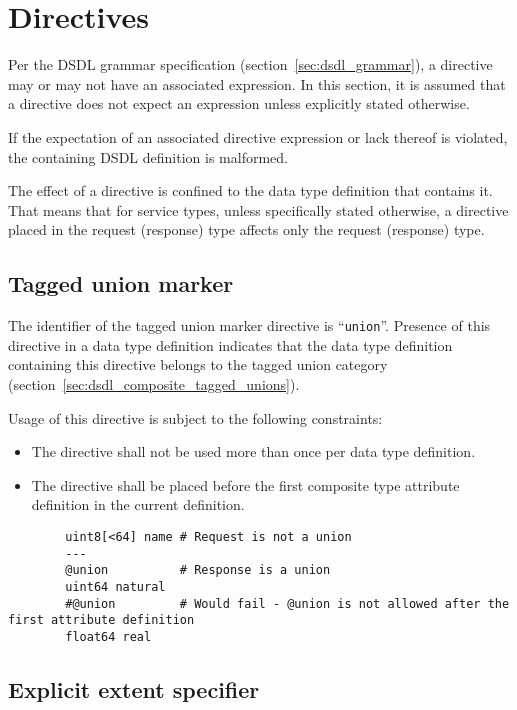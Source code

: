 \section{Directives}\label{sec:dsdl_directives}

Per the DSDL grammar specification (section~\ref{sec:dsdl_grammar}),
a directive may or may not have an associated expression.
In this section, it is assumed that a directive does not expect an expression unless explicitly stated otherwise.

If the expectation of an associated directive expression or lack thereof is violated,
the containing DSDL definition is malformed.

The effect of a directive is confined to the data type definition that contains it.
That means that for service types, unless specifically stated otherwise,
a directive placed in the request (response) type affects only the request (response) type.

\subsection{Tagged union marker}

The identifier of the tagged union marker directive is ``\verb|union|''.
Presence of this directive in a data type definition indicates that the
data type definition containing this directive belongs to the tagged union category
(section~\ref{sec:dsdl_composite_tagged_unions}).

Usage of this directive is subject to the following constraints:
\begin{itemize}
    \item The directive shall not be used more than once per data type definition.
    \item The directive shall be placed before the first composite type attribute definition in the current definition.
\end{itemize}

\begin{remark}
    \begin{verbatim}
        uint8[<64] name # Request is not a union
        ---
        @union          # Response is a union
        uint64 natural
        #@union         # Would fail - @union is not allowed after the first attribute definition
        float64 real
    \end{verbatim}
\end{remark}

\subsection{Explicit extent specifier}\label{sec:dsdl_directive_extent}

